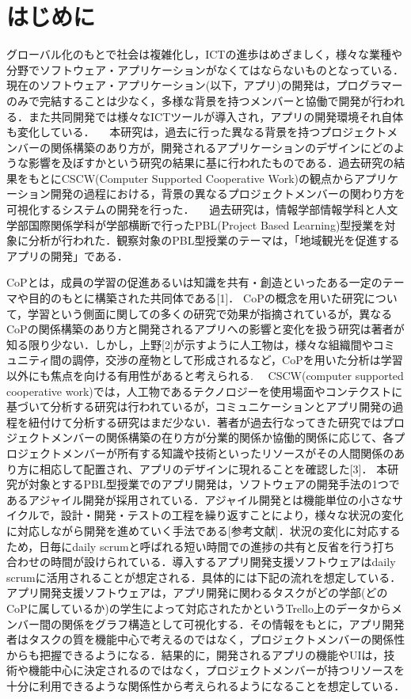 \documentclass[submit,techrep]{ipsj}
\begin{document}
\maketitle

\section{はじめに}

グローバル化のもとで社会は複雑化し，ICTの進歩はめざましく，様々な業種や分野でソフトウェア・アプリケーションがなくてはならないものとなっている．現在のソフトウェア・アプリケーション(以下，アプリ)の開発は，プログラマーのみで完結することは少なく，多様な背景を持つメンバーと協働で開発が行われる．また共同開発では様々なICTツールが導入され，アプリの開発環境それ自体も変化している．
　本研究は，過去に行った異なる背景を持つプロジェクトメンバーの関係構築のあり方が，開発されるアプリケーションのデザインにどのような影響を及ぼすかという研究の結果に基に行われたものである．過去研究の結果をもとにCSCW(Computer Supported Cooperative Work)の観点からアプリケーション開発の過程における，背景の異なるプロジェクトメンバーの関わり方を可視化するシステムの開発を行った．
　過去研究は，情報学部情報学科と人文学部国際関係学科が学部横断で行ったPBL(Project Based Learning)型授業を対象に分析が行われた．観察対象のPBL型授業のテーマは，「地域観光を促進するアプリの開発」である．


CoPとは，成員の学習の促進あるいは知識を共有・創造といったある一定のテーマや目的のもとに構築された共同体である[1]．
CoPの概念を用いた研究について，学習という側面に関しての多くの研究で効果が指摘されているが，異なるCoPの関係構築のあり方と開発されるアプリへの影響と変化を扱う研究は著者が知る限り少ない．しかし，上野[2]が示すように人工物は，様々な組織間やコミュニティ間の調停，交渉の産物として形成されるなど，CoPを用いた分析は学習以外にも焦点を向ける有用性があると考えられる.
　CSCW(computer supported cooperative work)では，人工物であるテクノロジーを使用場面やコンテクストに基づいて分析する研究は行われているが，コミュニケーションとアプリ開発の過程を紐付けて分析する研究はまだ少ない．著者が過去行なってきた研究ではプロジェクトメンバーの関係構築の在り方が分業的関係か協働的関係に応じて、各プロジェクトメンバーが所有する知識や技術といったリソースがその人間関係のあり方に相応して配置され、アプリのデザインに現れることを確認した[3]．
本研究が対象とするPBL型授業でのアプリ開発は，ソフトウェアの開発手法の1つであるアジャイル開発が採用されている．アジャイル開発とは機能単位の小さなサイクルで，設計・開発・テストの工程を繰り返すことにより，様々な状況の変化に対応しながら開発を進めていく手法である[参考文献]．状況の変化に対応するため，日毎にdaily scrumと呼ばれる短い時間での進捗の共有と反省を行う打ち合わせの時間が設けられている．導入するアプリ開発支援ソフトウェアはdaily scrumに活用されることが想定される．具体的には下記の流れを想定している．アプリ開発支援ソフトウェアは，アプリ開発に関わるタスクがどの学部(どのCoPに属しているか)の学生によって対応されたかというTrello上のデータからメンバー間の関係をグラフ構造として可視化する．その情報をもとに，アプリ開発者はタスクの質を機能中心で考えるのではなく，プロジェクトメンバーの関係性からも把握できるようになる．結果的に，開発されるアプリの機能やUIは，技術や機能中心に決定されるのではなく，プロジェクトメンバーが持つリソースを十分に利用できるような関係性から考えられるようになることを想定している．
\end{document}
